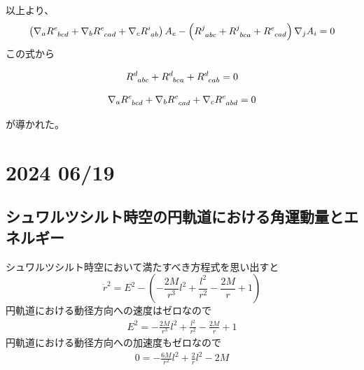 \documentclass[dvipdfmx]{report} %
\begin{document}
以上より、
\begin{equation*}
\begin{split}
	\left( \nabla_a \tensor{R}{^e_{bcd}} + \nabla_b \tensor{R}{^e_{cad}} + \nabla_c \tensor{R}{^i_{ab}} \right) A_e - \left( \tensor{R}{^j_{abc}} + \tensor{R}{^j_{bca}} + \tensor{R}{^e_{cad}} \right) \nabla_j A_i = 0
\end{split}
\end{equation*}
この式から
\begin{tcolorbox}[title=リーマンテンソルの対称性(1)]
\begin{equation*}
\begin{split}
\tensor{R}{^d_{abc}} + \tensor{R}{^d_{bca}} + \tensor{R}{^d_{cab}} = 0
\end{split}
\end{equation*}
\end{tcolorbox}\noindent
\begin{tcolorbox}[title=ビアンキの恒等式]
\begin{equation*}
\begin{split}
\nabla_a \tensor{R}{^e_{bcd}} + \nabla_b \tensor{R}{^e_{cad}} + \nabla_c \tensor{R}{^e_{abd}} = 0
\end{split}
\end{equation*}
\end{tcolorbox}\noindent
が導かれた。


\chapter{2024 06/19}
\section{
	シュワルツシルト時空の円軌道における角運動量とエネルギー
}
シュワルツシルト時空において満たすべき方程式を思い出すと
\[
\dot{r}^2 = E^2 - \left( - \frac{2M}{r^3} l^2 + \frac{l^2}{r^2} - \frac{2M}{r} + 1 \right)
\]
円軌道における動径方向への速度はゼロなので
\begin{equation}
\begin{split}
E^2 = - \frac{2M}{r^3} l^2 + \frac{l^2}{r^2} - \frac{2M}{r} + 1
\end{split}
\end{equation}
円軌道における動径方向への加速度もゼロなので
\begin{equation}
\begin{split}
0 = - \frac{6M}{r^2} l^2 + \frac{2}{r}l^2 - 2M
\end{split}
\end{equation}
\end{document}

